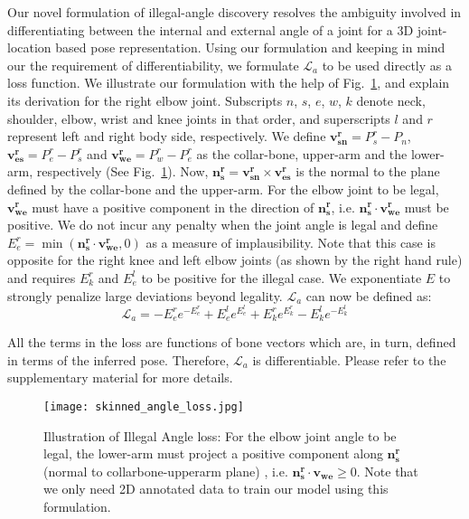 \documentclass[runningheads]{llncs}
\begin{document}
Our novel formulation of illegal-angle discovery resolves the ambiguity involved in differentiating between the internal and external angle of a joint for a 3D joint-location based pose representation. Using our formulation and keeping in mind our the requirement of differentiability, we formulate $\mathcal{L}_a$ to be used directly as a loss function.  We illustrate our formulation with the help of Fig.~\ref{fig:angLoss}, and explain its derivation for the right elbow joint. Subscripts $n$, $s$, $e$, $w$, $k$ denote neck, shoulder, elbow, wrist and knee joints in that order, and superscripts $l$ and $r$ represent left and right body side, respectively. 
We define \(\mathbf{v_{sn}^r} = P_s^r - P_n\), \(\mathbf{v_{es}^r} = P_e^r - P_s^r \) and \(\mathbf{v_{we}^r} = P_w^r - P_e^r \) as the collar-bone, upper-arm and the lower-arm, respectively (See Fig.~\ref{fig:angLoss}). Now, \(\mathbf{n_s^r} = \mathbf{v_{sn}^r \times \mathbf{v_{es}^r}  }\) is the normal to the plane defined by the collar-bone and the upper-arm. For the elbow joint to be legal, \(\mathbf{v_{we}^r}\) must have a positive component in the direction of $\mathbf{n_s^r}$, i.e. \(\mathbf{n_s^r} \cdot \mathbf{v_{we}^r} \) must be positive. We do not incur any penalty when the joint angle is legal and define \(E_e^r = \min(\mathbf{n_s^r} \cdot \mathbf{v_{we}^r}, 0)\) as a measure of implausibility. Note that this case is opposite for the right knee and left elbow joints (as shown by the right hand rule) and requires $E_k^r$ and $E_e^l$ to be positive for the illegal case. We exponentiate $E$ to strongly penalize large deviations beyond legality. $\mathcal{L}_a$ can now be defined as: \\ 

\begin{equation} \label{eq:langle}
 \mathcal{L}_a = -E_e^r e^{-E_e^r} + E_e^l e^{E_e^l} + E_k^r e^{E_k^r} - E_k^l e^{-E_k^l} 
\end{equation}

All the terms in the loss are functions of bone vectors which are, in turn, defined in terms of the inferred pose. Therefore, $\mathcal{L}_a$ is differentiable. Please refer to the supplementary material for more details. 

\begin{figure}[!tb] 
	\centering
	\texttt{[image: skinned\_angle\_loss.jpg]}
    \caption{Illustration of Illegal Angle loss: For the elbow joint angle to be legal, the lower-arm must project a positive component along $\mathbf{n_s^r}$ (normal to collarbone-upperarm plane) , i.e. $\mathbf{n_s^r} \cdot \mathbf{v_{we}} \geq 0$. Note that we only need 2D annotated data to train our model using this formulation.}
    \vspace{-1em}
    \label{fig:angLoss}
\end{figure}
\end{document}
